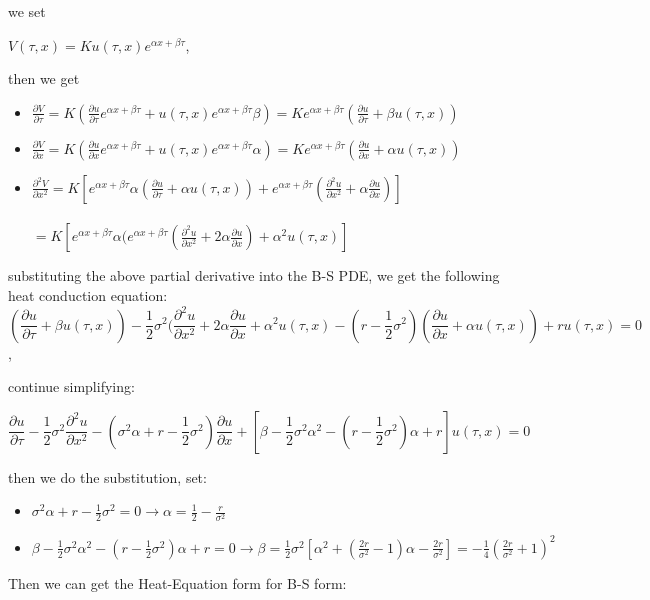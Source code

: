 \documentclass{article}
\begin{document}
we set 
\begin{center}
$V(\tau, x) = Ku(\tau, x)e^{\alpha x + \beta \tau}$,
\end{center}
then we get
\begin{itemize}
\item$\frac{\partial V}{\partial \tau} = K(\frac{\partial u}{\partial \tau}e^{\alpha x + \beta \tau}+u(\tau, x)e^{\alpha x + \beta \tau}\beta)= Ke^{\alpha x + \beta \tau}(\frac{\partial u}{\partial \tau}+\beta u(\tau, x))$ 
\item$\frac{\partial V}{\partial x} = K(\frac{\partial u}{\partial x}e^{\alpha x + \beta \tau}+u(\tau, x)e^{\alpha x + \beta \tau}\alpha)= Ke^{\alpha x + \beta \tau}(\frac{\partial u}{\partial x}+\alpha u(\tau, x))$
\item$\frac{\partial^2 V}{\partial x^2} = K[e^{\alpha x + \beta \tau}\alpha(\frac{\partial u}{\partial \tau}+\alpha u(\tau, x))+e^{\alpha x + \beta \tau}(\frac{\partial^2 u}{\partial x^2}+\alpha \frac{\partial u}{\partial x})]$\\
\\
$= K[e^{\alpha x + \beta \tau}\alpha(e^{\alpha x + \beta \tau}(\frac{\partial^2 u}{\partial x^2}+2\alpha \frac{\partial u}{\partial x})+\alpha^2u(\tau, x)]$ 
\end{itemize}
substituting the above partial derivative into the B-S PDE, we get the following heat conduction equation:\\

$$(\frac{\partial u}{\partial \tau}+\beta u(\tau,x)) - \frac{1}{2} \sigma^2 (\frac{\partial^2 u}{\partial x^2}+2\alpha\frac{\partial u}{\partial x }+\alpha^2 u(\tau, x)- (r - \frac{1}{2}\sigma^2)(\frac{\partial u}{\partial x}+\alpha u(\tau,x)) + ru(\tau,x) = 0$$,

continue simplifying:

$$\frac{\partial u}{\partial \tau} - \frac{1}{2} \sigma^2 \frac{\partial^2 u}{\partial x^2}-(\sigma^2 \alpha +r - \frac{1}{2}\sigma^2)\frac{\partial u}{\partial x}+[\beta - \frac{1}{2}\sigma^2\alpha^2-(r-\frac{1}{2}\sigma^2)\alpha + r]u(\tau,x) = 0$$

then we do the substitution, set:
\begin{itemize}
\item$\sigma^2\alpha+r-\frac{1}{2}\sigma^2 = 0 \rightarrow \alpha = \frac{1}{2}-\frac{r}{\sigma^2}$
\item$\beta - \frac{1}{2}\sigma^2 \alpha^2 - (r - \frac{1}{2}\sigma^2)\alpha+r = 0 \rightarrow \beta = \frac{1}{2}\sigma^2[\alpha^2 + (\frac{2r}{\sigma^2}-1)\alpha - \frac{2r}{\sigma^2}] = -\frac{1}{4}(\frac{2r}{\sigma^2}+1)^2$
\end{itemize}
Then we can get the Heat-Equation form for B-S form:
\end{document}
